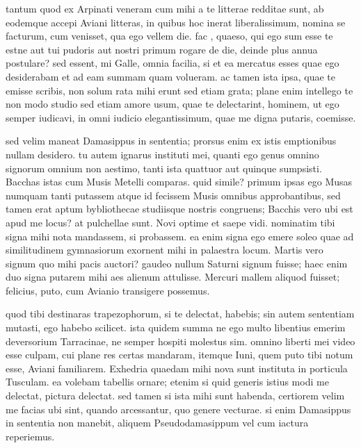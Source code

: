 


 tantum quod ex Arpinati veneram cum mihi a te litterae redditae sunt, ab eodemque accepi Aviani litteras, in quibus hoc inerat liberalissimum, nomina se facturum, cum venisset, qua ego vellem die. fac , quaeso, qui ego sum esse te estne aut tui pudoris aut nostri primum rogare de die, deinde plus annua postulare? sed essent, mi Galle, omnia facilia, si et ea mercatus esses quae ego desiderabam et ad eam summam quam volueram. ac tamen ista ipsa, quae te emisse scribis, non solum rata mihi erunt sed etiam grata; plane enim intellego te non modo studio sed etiam amore usum, quae te delectarint, hominem, ut ego semper iudicavi, in omni iudicio elegantissimum, quae me digna putaris, coemisse.

 sed velim maneat Damasippus in sententia; prorsus enim ex istis emptionibus nullam desidero. tu autem ignarus instituti mei, quanti ego genus omnino signorum omnium non aestimo, tanti ista quattuor aut quinque sumpsisti. Bacchas istas cum Musis Metelli comparas. quid simile? primum ipsas ego Musas numquam tanti putassem atque id fecissem Musis omnibus approbantibus, sed tamen erat aptum bybliothecae studiisque nostris congruens; Bacchis vero ubi est apud me locus? at pulchellae sunt. Novi optime et saepe vidi. nominatim tibi signa mihi nota mandassem, si probassem. ea enim signa ego emere soleo quae ad similitudinem gymnasiorum exornent mihi in palaestra locum. Martis vero signum quo mihi pacis auctori? gaudeo nullum Saturni signum fuisse; haec enim duo signa putarem mihi aes alienum attulisse. Mercuri mallem aliquod fuisset; felicius, puto, cum Avianio transigere possemus.

 quod tibi destinaras trapezophorum, si te delectat, habebis; sin autem sententiam mutasti, ego habebo scilicet. ista quidem summa ne ego multo libentius emerim deversorium Tarracinae, ne semper hospiti molestus sim. omnino liberti mei video esse culpam, cui plane res certas mandaram, itemque Iuni, quem puto tibi notum esse, Aviani familiarem. Exhedria quaedam mihi nova sunt instituta in porticula Tusculam. ea volebam tabellis ornare; etenim si quid generis istius modi me delectat, pictura delectat. sed tamen si ista mihi sunt habenda, certiorem velim me facias ubi sint, quando arcessantur, quo genere vecturae. si enim Damasippus in sententia non manebit, aliquem Pseudodamasippum vel cum iactura reperiemus.

